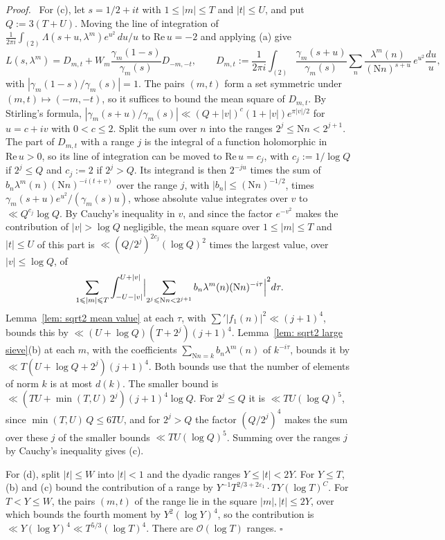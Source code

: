 \documentclass{article}
\numberwithin{equation}{section}
\newenvironment{proof}[1][Proof]{\par\medskip\noindent\textit{#1.}\ }{\hfill$\square$\par\medskip}
\newcommand{\Le}{\leqslant}
\begin{document}
\begin{proof}
For (c), let $s = 1/2 + it$ with $1 \Le |m| \Le T$ and $|t| \Le U$, and put $Q := 3(T + U)$. Moving the line of integration of $\frac{1}{2\pi i} \int_{(2)} \Lambda(s + u, \lambda^m) e^{u^2}\, du/u$ to $\mathrm{Re}\, u = -2$ and applying (a) give
\begin{equation*}
L(s, \lambda^m) = D_{m,t} + W_m \frac{\gamma_m(1 - s)}{\gamma_m(s)} D_{-m,-t}, \qquad D_{m,t} := \frac{1}{2\pi i} \int_{(2)} \frac{\gamma_m(s + u)}{\gamma_m(s)} \sum_{n} \frac{\lambda^m(n)}{(\mathrm{N}n)^{s + u}}\, e^{u^2} \frac{du}{u},
\end{equation*}
with $|\gamma_m(1 - s)/\gamma_m(s)| = 1$. The pairs $(m, t)$ form a set symmetric under $(m, t) \mapsto (-m, -t)$, so it suffices to bound the mean square of $D_{m,t}$. By Stirling's formula, $|\gamma_m(s + u)/\gamma_m(s)| \ll (Q + |v|)^{c} (1 + |v|) e^{\pi|v|/2}$ for $u = c + iv$ with $0 < c \Le 2$. Split the sum over $n$ into the ranges $2^j \Le \mathrm{N}n < 2^{j+1}$. The part of $D_{m,t}$ with a range $j$ is the integral of a function holomorphic in $\mathrm{Re}\, u > 0$, so its line of integration can be moved to $\mathrm{Re}\, u = c_j$, with $c_j := 1/\log Q$ if $2^j \Le Q$ and $c_j := 2$ if $2^j > Q$. Its integrand is then $2^{-ju}$ times the sum of $b_n \lambda^m(n) (\mathrm{N}n)^{-i(t + v)}$ over the range $j$, with $|b_n| \Le (\mathrm{N}n)^{-1/2}$, times $\gamma_m(s + u) e^{u^2}/(\gamma_m(s) u)$, whose absolute value integrates over $v$ to $\ll Q^{c_j} \log Q$. By Cauchy's inequality in $v$, and since the factor $e^{-v^2}$ makes the contribution of $|v| > \log Q$ negligible, the mean square over $1 \Le |m| \Le T$ and $|t| \Le U$ of this part is $\ll (Q/2^j)^{2c_j} (\log Q)^2$ times the largest value, over $|v| \Le \log Q$, of
\begin{equation*}
\sum_{1 \Le |m| \Le T} \int_{-U - |v|}^{U + |v|} \Bigl| \sum_{2^j \Le \mathrm{N}n < 2^{j+1}} b_n \lambda^m(n) (\mathrm{N}n)^{-i\tau} \Bigr|^2 d\tau.
\end{equation*}
Lemma~\ref{lem: sqrt2 mean value} at each $\tau$, with $\sum'|f_1(n)|^2 \ll (j + 1)^4$, bounds this by $\ll (U + \log Q)(T + 2^j)(j + 1)^4$. Lemma~\ref{lem: sqrt2 large sieve}(b) at each $m$, with the coefficients $\sum_{\mathrm{N}n = k} b_n \lambda^m(n)$ of $k^{-i\tau}$, bounds it by $\ll T(U + \log Q + 2^j)(j + 1)^4$. Both bounds use that the number of elements of norm $k$ is at most $d(k)$. The smaller bound is $\ll (TU + \min(T, U)\, 2^j)(j + 1)^4 \log Q$. For $2^j \Le Q$ it is $\ll TU (\log Q)^5$, since $\min(T, U)\, Q \Le 6TU$, and for $2^j > Q$ the factor $(Q/2^j)^4$ makes the sum over these $j$ of the smaller bounds $\ll TU (\log Q)^5$. Summing over the ranges $j$ by Cauchy's inequality gives (c).

For (d), split $|t| \Le W$ into $|t| < 1$ and the dyadic ranges $Y \Le |t| < 2Y$. For $Y \Le T$, (b) and (c) bound the contribution of a range by $Y^{-1} T^{2/3 + 2\varepsilon_1} \cdot TY (\log T)^C$. For $T < Y \Le W$, the pairs $(m, t)$ of the range lie in the square $|m|, |t| \Le 2Y$, over which \citet[Theorem~2.2]{duke1989some} bounds the fourth moment by $Y^2 (\log Y)^4$, so the contribution is $\ll Y (\log Y)^4 \ll T^{5/3} (\log T)^4$. There are $\mathcal{O}(\log T)$ ranges.
\end{proof}
\end{document}

